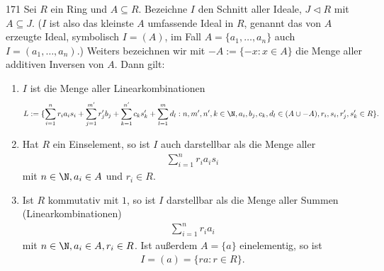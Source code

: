 \begin{algebraUE}{171}
Sei $R$ ein Ring und $A \subseteq R$. Bezeichne $I$ den Schnitt aller Ideale,
$J \vartriangleleft R$ mit $A \subseteq J$. ($I$ ist also das kleinste $A$ umfassende
Ideal in $R$, genannt das von $A$ erzeugte Ideal, symbolisch $I = (A)$, im Fall
$A = \{a_1,\dots,a_n\}$ auch $I = (a_1,\dots,a_n)$.)
Weiters bezeichnen wir mit $-A := \{-x: x \in A\}$ die Menge aller additiven Inversen von $A$.
Dann gilt:
\begin{enumerate}[label = (\arabic*)]
  \item $I$ ist die Menge aller Linearkombinationen
  \begin{align}\label{lk}
    L := \{\sum_{i = 1}^n r_ia_is_i + \sum_{j = 1}^{m^{\prime}}r_j^{\prime}b_j +
    \sum_{k = 1}^{n^{\prime}}c_ks_k^{\prime} + \sum_{l = 1}^{m}d_l :
    n,m^{\prime}, n^{\prime}, k \in \N, a_i, b_j, c_k, d_l \in (A \cup -A),
    r_i, s_i, r_j^{\prime}, s_k^{\prime} \in R \}.
  \end{align}
  \item Hat $R$ ein Einselement, so ist $I$ auch darstellbar als die Menge aller
  \begin{align*}
    \sum_{i = 1}^n r_ia_is_i
  \end{align*}
  mit $n \in \N, a_i \in A$ und $r_i \in R$.
  \item Ist $R$ kommutativ mit $1$, so ist $I$ darstellbar als die Menge aller
  Summen (Linearkombinationen)
  \begin{align*}
    \sum_{i=1}^n r_ia_i
  \end{align*}
  mit $n \in \N, a_i \in A, r_i \in R$. Ist außerdem $A = \{a\}$ einelementig, so ist
  \begin{align*}
    I = (a) = \{ra: r \in R\}.
  \end{align*}
\end{enumerate}
\end{algebraUE}
